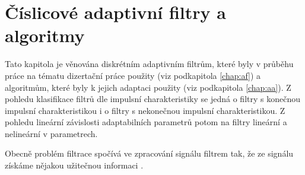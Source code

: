 \chapter{Číslicové adaptivní filtry a algoritmy}\label{chap:af_reserse}
Tato kapitola je věnována diskrétním adaptivním filtrům, které byly v průběhu práce na tématu dizertační práce použity (viz podkapitola \ref{chap:af}) a algoritmům, které byly k jejich adaptaci použity (viz podkapitola \ref{chap:aa}). Z pohledu klasifikace filtrů dle impulsní charakteristiky se jedná o filtry s konečnou impulsní charakteristikou i o filtry s nekonečnou impulsní charakteristikou. Z pohledu lineární závislosti adaptabilních parametrů potom na filtry lineární a nelineární v parametrech.
\par 
Obecně problém filtrace spočívá ve zpracování signálu filtrem tak, že ze signálu získáme nějakou užitečnou informaci \cite{haykin}.

